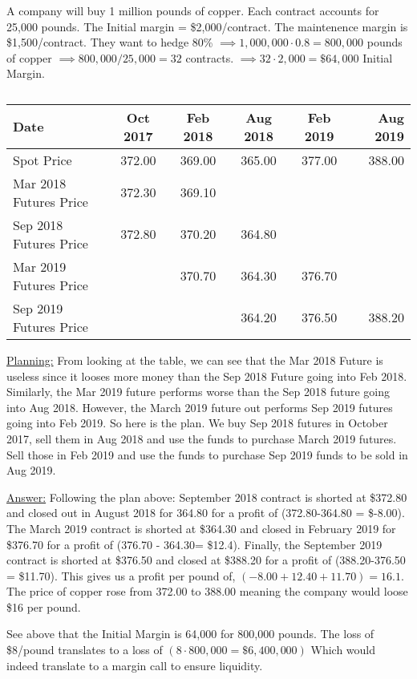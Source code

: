 \documentclass[12pt]{article}
\newenvironment{problem}[3][Problem]{\begin{trivlist}
\item[\hskip \labelsep {\bfseries #1}\hskip \labelsep {\bfseries #2.}]}{\end{trivlist}}
\begin{document}
\newpage
\begin{problem}{3.32}. A company will buy 1 million pounds of copper. Each contract accounts for 25,000 pounds. The Initial margin = \$2,000/contract. The maintenence margin is \$1,500/contract. They want to hedge 80\% $\implies 1,000,000 \cdot 0.8 = 800,000$ pounds of copper $\implies 800,000/25,000 = 32$ contracts. $\implies 32 \cdot 2,000 = \$ 64,000 $ Initial Margin. 
\begin{table}[h!]
\centering
\begin{tabular}{ l | c | c | c | c | r }	
Date & Oct 2017 & Feb 2018 & Aug 2018 & Feb 2019 & Aug 2019 \\
\hline
Spot Price &  372.00 & 369.00 & 365.00 & 377.00 & 388.00 \\
Mar 2018 Futures Price & 372.30 & 369.10 & & & \\
Sep 2018 Futures Price & 372.80 & 370.20 & 364.80 & & \\
Mar 2019 Futures Price &  & 370.70 & 364.30 & 376.70 & \\ 
Sep 2019 Futures Price & & & 364.20 & 376.50 & 388.20 \\
\end{tabular}
\caption{}
\end{table}

\underline{Planning:} From looking at the table, we can see that the Mar 2018 Future is useless since it looses more money than the Sep 2018 Future going into Feb 2018. Similarly, the Mar 2019 future performs worse than the Sep 2018 future going into Aug 2018. However, the March 2019 future out performs Sep 2019 futures going into Feb 2019.
 So here is the plan. We buy Sep 2018 futures in October 2017, sell them in Aug 2018 and use the funds to purchase March 2019 futures. Sell those in Feb 2019 and use the funds to purchase Sep 2019 funds to be sold in Aug 2019. 

\underline{Answer:} Following the plan above: September 2018 contract is shorted at \$372.80 and closed out in August 2018 for 364.80 for a profit of (372.80-364.80 = \$-8.00). The March 2019 contract is shorted at \$364.30 and closed in February 2019 for \$376.70 for a profit of (376.70 - 364.30= \$12.4). Finally, the September 2019 contract is shorted at \$376.50 and closed at \$388.20 for a profit of (388.20-376.50 = \$11.70). This gives us a profit per pound of, $(-8.00 + 12.40 + 11.70) = 16.1$. The price of copper rose from 372.00 to 388.00 meaning the company would loose \$16 per pound.

See above that the Initial Margin is 64,000 for 800,000 pounds. The loss of \$8/pound translates to a loss of $(8 \cdot 800,000 = \$6,400,000)$ Which would indeed translate to a margin call to ensure liquidity. 	

\end{problem}
\end{document}
